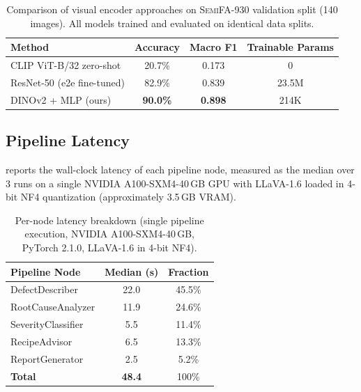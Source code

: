 \documentclass[conference]{IEEEtran}
\newcommand{\semidataset}{\textsc{SemiFA-930}}
\begin{document}
\begin{table}[t]
    \centering
    \caption{Comparison of visual encoder approaches on \semidataset{} validation split (140 images). All models trained and evaluated on identical data splits.}
    \label{tab:encoder_comparison}
    \begin{tabular}{@{}lccc@{}}
        \toprule
        \textbf{Method} & \textbf{Accuracy} & \textbf{Macro F1} & \textbf{Trainable Params} \\
        \midrule
        CLIP ViT-B/32 zero-shot      & 20.7\% & 0.173 & 0 \\
        ResNet-50 (e2e fine-tuned)   & 82.9\% & 0.839 & 23.5M \\
        DINOv2 + MLP (ours)          & \textbf{90.0\%} & \textbf{0.898} & 214K \\
        \bottomrule
    \end{tabular}
\end{table}

\subsection{Pipeline Latency}

 reports the wall-clock latency of each pipeline node, measured as the median over 3 runs on a single NVIDIA A100-SXM4-40\,GB GPU with LLaVA-1.6 loaded in 4-bit NF4 quantization (approximately 3.5\,GB VRAM).

\begin{table}[t]
    \centering
    \caption{Per-node latency breakdown (single pipeline execution, NVIDIA A100-SXM4-40\,GB, PyTorch 2.1.0, LLaVA-1.6 in 4-bit NF4).}
    \label{tab:latency}
    \begin{tabular}{@{}lcc@{}}
        \toprule
        \textbf{Pipeline Node} & \textbf{Median (s)} & \textbf{Fraction} \\
        \midrule
        DefectDescriber        & 22.0 & 45.5\% \\
        RootCauseAnalyzer      & 11.9 & 24.6\% \\
        SeverityClassifier     & 5.5  & 11.4\% \\
        RecipeAdvisor          & 6.5  & 13.3\% \\
        ReportGenerator        & 2.5  & 5.2\% \\
        \midrule
        \textbf{Total}         & \textbf{48.4} & 100\% \\
        \bottomrule
    \end{tabular}
\end{table}
\end{document}
